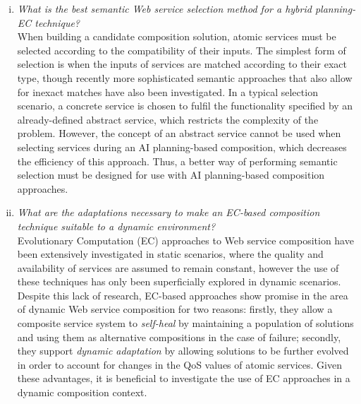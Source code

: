 \begin{enumerate}[(i)]
\item \label{goal:semantic} \textit{What is the best semantic Web service selection method for a hybrid planning-EC technique?}\\
When building a candidate composition solution, atomic services must be selected according to the compatibility of their inputs. The simplest form of selection is when the inputs of services are matched according to their exact type, though recently more sophisticated semantic approaches that also allow for inexact matches have also been investigated. In a typical selection scenario, a concrete service is chosen to fulfil the functionality specified by an already-defined abstract service, which restricts the complexity of the problem. However, the concept of an abstract service cannot be used when selecting services during an AI planning-based composition, which decreases the efficiency of this approach. Thus, a better way of performing semantic selection must be designed for use with AI planning-based composition approaches.

\item \label{goal:dynamic} \textit{What are the adaptations necessary to make an EC-based composition technique suitable to a dynamic environment?}\\
Evolutionary Computation (EC) approaches to Web service composition have been extensively investigated in static scenarios, where the quality and availability of services are assumed to remain constant, however the use of these techniques has only been superficially explored in dynamic scenarios. Despite this lack of research, EC-based approaches show promise in the area of dynamic Web service composition for two reasons: firstly, they allow a composite service system to \textit{self-heal} by maintaining a population of solutions and using them as alternative compositions in the case of failure; secondly, they support \textit{dynamic adaptation} by allowing solutions to be further evolved in order to account for changes in the QoS values of atomic services. Given these advantages, it is beneficial to investigate the use of EC approaches in a dynamic composition context.


\end{enumerate}
